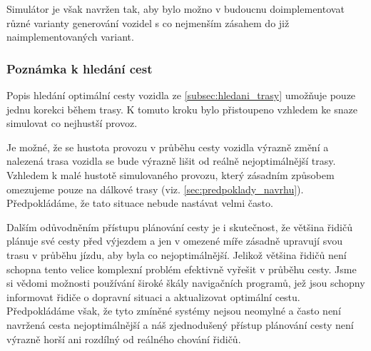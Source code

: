 Simulátor je však navržen tak, aby bylo možno v budoucnu doimplementovat různé 
varianty generování vozidel s co nejmenším zásahem do již naimplementovaných 
variant. 


\subsubsection{Poznámka k hledání cest}

Popis hledání optimální cesty vozidla ze \cref{subsec:hledani_trasy} umožňuje
pouze jednu korekci během trasy. K tomuto kroku bylo přistoupeno vzhledem ke snaze
simulovat co nejhustší provoz. 

Je možné, že se hustota provozu v průběhu cesty vozidla výrazně změní a nalezená
trasa vozidla se bude výrazně lišit od reálně nejoptimálnější trasy. 
Vzhledem k malé hustotě simulovaného provozu, který zásadním způsobem omezujeme
pouze na dálkové trasy (viz. \cref{sec:predpoklady_navrhu}). Předpokládáme,
že tato situace nebude nastávat velmi často. 

Dalším odůvodněním přístupu plánování cesty je i skutečnost, že většina řidičů
plánuje své cesty před výjezdem a jen v omezené míře zásadně upravují svou 
trasu v průběhu jízdu, aby byla co nejoptimálnější. Jelikož většina řidičů není
schopna tento velice komplexní problém efektivně vyřešit v průběhu cesty. 
Jsme si vědomi možnosti používání široké škály navigačních programů, jež jsou 
schopny informovat řidiče o dopravní situaci a aktualizovat optimální cestu.
Předpokládáme však, že tyto zmíněné systémy nejsou neomylné a často není 
navržená cesta nejoptimálnější a náš zjednodušený přístup plánování cesty 
není výrazně horší ani rozdílný od reálného chování řidičů. 
